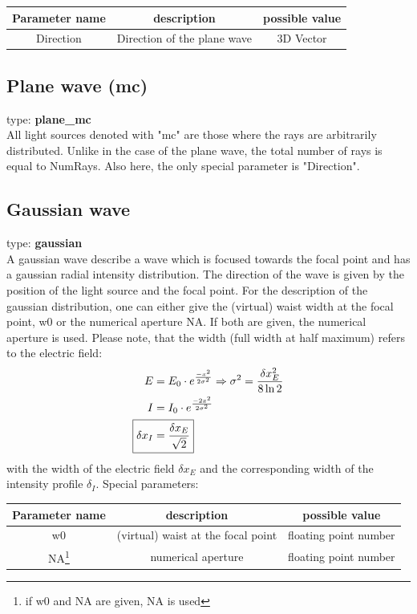\documentclass[a4paper,html,11pt,openany]{book}
\begin{document}
\vspace{1em} 
  \begin{tabular}{c|c|c}
 Parameter name & description  & possible value \\
 \hline
 Direction & Direction of the plane wave & 3D Vector  
 \end{tabular}
 
 \subsection{Plane wave (mc)} 
 type: \textbf{plane\_mc} \\ 
 All light sources denoted with "mc" are those where the rays are arbitrarily distributed. Unlike in the case of the plane wave, the total number of rays is equal to NumRays. Also here, the only special parameter is "Direction". 
 
\subsection{Gaussian wave}
 type: \textbf{gaussian} \\
A gaussian wave describe a wave which is focused  towards the focal point and has a gaussian radial intensity distribution. The direction of the wave is given by the position of the light source and the focal point. For the description of the gaussian distribution, one can either give the (virtual) waist width at the focal point, w0 or the numerical aperture NA. If both are given, the numerical aperture is used. Please note, that the width (full width at half maximum) refers to the electric field: \\ 

\begin{align}
E&=E_0 \cdot e^{\frac{-x^2}{2\sigma^2}} \Rightarrow \sigma^2=\frac{\delta x_E^2}{8\ln2} \\
I&=I_0 \cdot e^{\frac{-2x^2}{2\sigma^2}} \\
\Aboxed {\delta x_I&=\frac{\delta x_E}{\sqrt{2}}}
\end{align}
with the width of the electric field $\delta x_E$ and the corresponding width of the intensity profile $\delta_I$.
\vspace{1em}
Special parameters:

\vspace{1em}
 \begin{tabular}{c|c|c}
 Parameter name & description  & possible value \\
 \hline
 w0 & (virtual) waist at the focal point & floating point number \\
 \hline
 NA\footnote{if w0 and NA are given, NA is used} & numerical aperture & floating point number \\ 
 \end{tabular}
\end{document}
